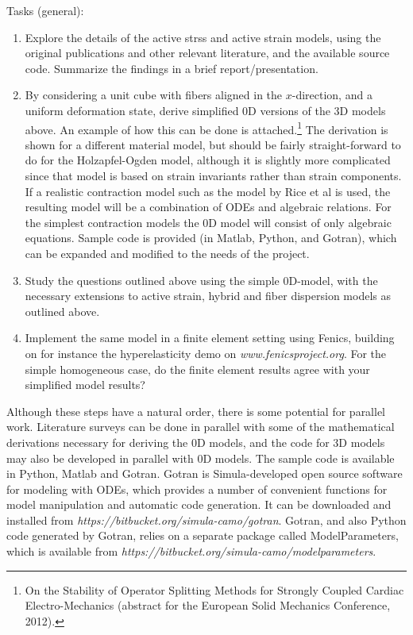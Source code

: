 \documentclass[epsfig,11pt]{article}
\begin{document}
\begin{description}
\item{Tasks (general):}
\begin{enumerate}
\item Explore the details of the active strss and active strain models, using the original publications and other relevant literature, and the available source code. Summarize the findings in a brief report/presentation.
\item By considering a unit cube with fibers aligned in the $x$-direction, and a uniform deformation state, derive simplified 0D versions of the 3D models above. An example of how this can be done is attached.\footnote{On the Stability of Operator Splitting Methods for Strongly Coupled Cardiac Electro-Mechanics (abstract for the European Solid Mechanics Conference, 2012).} The derivation is shown for a different material model, but should be fairly straight-forward to do for the Holzapfel-Ogden model, although it is slightly more complicated since that model is based on strain invariants rather than strain components. 
If a realistic contraction model such as the model by Rice et al is used, the resulting model will be a combination of ODEs and algebraic relations. For the simplest contraction models the 0D model will consist of only algebraic equations. Sample code is provided (in Matlab, Python, and Gotran), which can be expanded and modified to the needs of the project.
\item Study the questions outlined above using the simple 0D-model, with the necessary extensions to active strain, hybrid and fiber dispersion models as outlined above.
\item Implement the same model in a finite element setting using Fenics, building on for instance the hyperelasticity demo on \emph{www.fenicsproject.org}. For the simple homogeneous case, do the finite element results agree with your simplified model results? 
\end{enumerate}
Although these steps have a natural order, there is some potential for parallel work. Literature surveys can be done in parallel with some of the mathematical derivations necessary for deriving the 0D models, and the code for 3D models may also be developed in parallel with 0D models.  The sample code is available in Python, Matlab and Gotran. Gotran is Simula-developed open source software for modeling with ODEs, which provides a number of convenient functions for model manipulation and automatic code generation. It can be downloaded and installed from \emph{https://bitbucket.org/simula-camo/gotran}. Gotran, and also Python code generated by Gotran, relies on a separate package called ModelParameters, which is available from \emph{https://bitbucket.org/simula-camo/modelparameters}.
\end{description}



\end{document}
